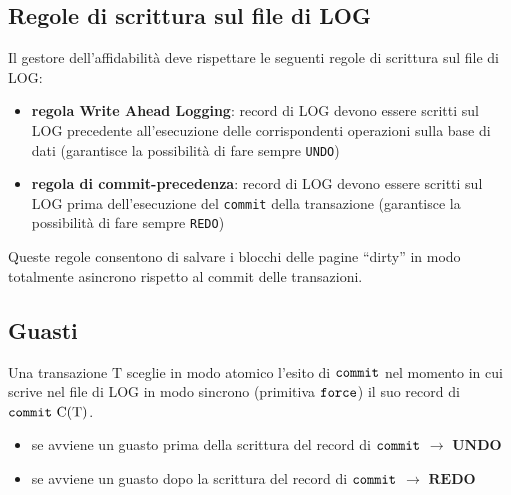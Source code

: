 \subsection{Regole di scrittura sul file di LOG}
Il gestore dell'affidabilità deve rispettare le seguenti regole di scrittura sul file di LOG:
\begin{itemize}[label=$\Rightarrow$, itemsep=\smallskipamount]
  \item \textbf{regola Write Ahead Logging}: record di LOG devono essere scritti sul LOG precedente all'esecuzione delle corrispondenti operazioni sulla base di dati (garantisce la possibilità di fare sempre \texttt{UNDO})
  \item \textbf{regola di commit-precedenza}: record di LOG devono essere scritti sul LOG prima dell'esecuzione del \texttt{commit} della transazione (garantisce la possibilità di fare sempre \texttt{REDO})
\end{itemize}

Queste regole consentono di salvare i blocchi delle pagine “dirty” in modo totalmente asincrono rispetto al commit delle transazioni.

\subsection{Guasti}
Una transazione $\mathrm{T}$ sceglie in modo atomico l'esito di $\verb|commit|$ nel momento in cui scrive nel file di LOG in modo sincrono (primitiva $\verb|force|$) il suo record di $\verb|commit| \ \mathrm{C(T)}$. 

\begin{itemize}[label=$\Rightarrow$, itemsep=\smallskipamount]
  \item se avviene un guasto prima della scrittura del record di $\verb|commit|$ $\rightarrow$ $\mathbf{UNDO}$
  \item se avviene un guasto dopo la scrittura del record di $\verb|commit|$ $\rightarrow$ $\mathbf{REDO}$
\end{itemize}

